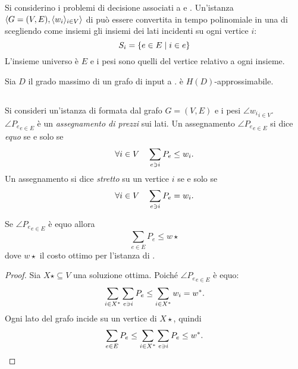 Si considerino i problemi di decisione associati a \VertexCover e \MinSetCover.
Un'istanza $\tuple{G=(V,E),\angle{w_i}_{i\in V}}$ di \VertexCover può essere convertita in tempo polinomiale in una di \MinSetCover scegliendo come insiemi gli insiemi dei lati incidenti su ogni vertice $i$:
\begin{equation*}
	S_i=\set{e\in E\mid i\in e}
\end{equation*}
L'insieme universo è $E$ e i pesi sono quelli del vertice relativo a ogni insieme.

\begin{theorem}
	Sia $D$ il grado massimo di un grafo di input a \VertexCover. \VertexCover è $H(D)$-approssimabile.
\end{theorem}


\subsection{\PricedVertexCover}
Si consideri un'istanza di \VertexCover formata dal grafo $G=(V,E)$ e i pesi $\angle{w_i}_{i\in V}$.
$\angle{P_e}_{e\in E}$ è un \emph{assegnamento di prezzi} sui lati.
Un assegnamento $\angle{P_e}_{e\in E}$ si dice \emph{equo} se e solo se
\begin{equation*}
	\forall i\in V\quad\sum_{e\ni i} P_e\leq w_i \text.
\end{equation*}
Un assegnamento si dice \emph{stretto} su un vertice $i$ se e solo se
\begin{equation*}
	\forall i\in V\quad\sum_{e\ni i} P_e = w_i \text.
\end{equation*}

\begin{lemma}\label{lem:vcov_pricing_eq_sum_p_e_w_opt}
	Se $\angle{P_e}_{e\in E}$ è equo allora
	\begin{equation*}
		\sum_{e\in E} P_e \leq w\star
	\end{equation*}
	dove $w\star$ il costo ottimo per l'istanza di \VertexCover.
\end{lemma}
\begin{proof}
	Sia $X\star\subseteq V$ una soluzione ottima. Poiché $\angle{P_e}_{e\in E}$ è equo:
	\begin{equation*}
		\sum_{i\in X\star} \sum_{e\ni i} P_e \leq \sum_{i\in X\star} w_i = w\star \text.
	\end{equation*}
	Ogni lato del grafo incide su un vertice di $X\star$, quindi
	\begin{equation*}
		\sum_{e\in E} P_e \leq \sum_{i\in X\star} \sum_{e\ni i} P_e \leq w\star \text.
	\end{equation*}
\end{proof}


